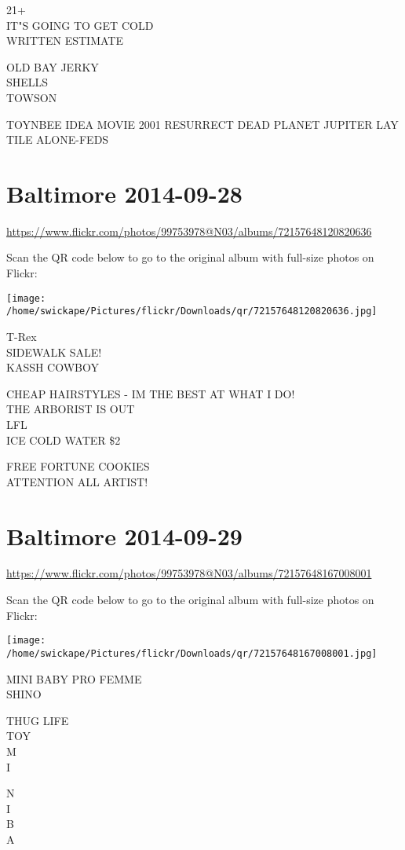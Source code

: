 \documentclass[10pt,letterpaper]{article}
\begin{document}
21+\\
IT"S GOING TO GET COLD\\
WRITTEN ESTIMATE

OLD BAY JERKY\\
SHELLS\\
TOWSON

TOYNBEE IDEA MOVIE 2001 RESURRECT DEAD PLANET JUPITER LAY TILE ALONE{-}FEDS
\pagebreak

\section*{Baltimore 2014-09-28}

\url{https://www.flickr.com/photos/99753978@N03/albums/72157648120820636}

Scan the QR code below to go to the original album with full-size photos on Flickr:

\texttt{[image: /home/swickape/Pictures/flickr/Downloads/qr/72157648120820636.jpg]}
\pagebreak

T{-}Rex\\
SIDEWALK SALE!\\
KASSH COWBOY

CHEAP HAIRSTYLES {-} IM THE BEST AT WHAT I DO!\\
THE ARBORIST IS OUT\\
LFL\\
ICE COLD WATER \$2

FREE FORTUNE COOKIES\\
ATTENTION ALL ARTIST!
\pagebreak

\section*{Baltimore 2014-09-29}

\url{https://www.flickr.com/photos/99753978@N03/albums/72157648167008001}

Scan the QR code below to go to the original album with full-size photos on Flickr:

\texttt{[image: /home/swickape/Pictures/flickr/Downloads/qr/72157648167008001.jpg]}
\pagebreak

MINI BABY PRO FEMME\\
SHINO

THUG LIFE\\
TOY\\
M\\
I

N\\
I\\
B\\
A
\end{document}
